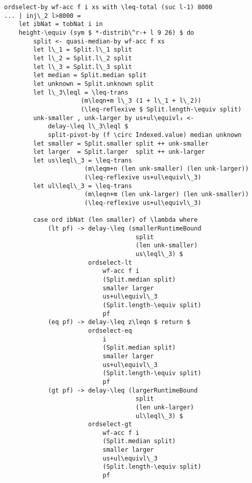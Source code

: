 \begin{lstlisting}[caption={Quickselect ($l > 8000$)},label={lst:median:quickselect:large},emph={ordselect,by}]
ordselect-by wf-acc f i xs with \leq-total (suc l-1) 8000
... | inj\_2 l>8000 =
    let ibNat = tobNat i in
    height-\equiv (sym $ *-distrib\^r-+ l 9 26) $ do
        split <- quasi-median-by wf-acc f xs
        let l\_1 = Split.l\_1 split
        let l\_2 = Split.l\_2 split
        let l\_3 = Split.l\_3 split
        let median = Split.median split
        let unknown = Split.unknown split
        let l\_3\leql = \leq-trans
                     (m\leqn+m l\_3 (1 + l\_1 + l\_2))
                     (\leq-reflexive $ Split.length-\equiv split)
        unk-smaller , unk-larger by us+ul\equivl₃ <-
            delay-\leq l\_3\leql $
            split-pivot-by (f \circ Indexed.value) median unknown
        let smaller = Split.smaller split ++ unk-smaller
        let larger  = Split.larger  split ++ unk-larger
        let us\leql\_3 = \leq-trans
                      (m\leqm+n (len unk-smaller) (len unk-larger))
                      (\leq-reflexive us+ul\equivl\_3)
        let ul\leql\_3 = \leq-trans
                      (m\leqn+m (len unk-larger) (len unk-smaller))
                      (\leq-reflexive us+ul\equivl\_3)

        case ord ibNat (len smaller) of \lambda where
            (lt pf) -> delay-\leq (smallerRuntimeBound
                                    split
                                    (len unk-smaller)
                                    us\leql\_3) $
                       ordselect-lt
                           wf-acc f i
                           (Split.median split)
                           smaller larger
                           us+ul\equivl\_3
                           (Split.length-\equiv split)
                           pf
            (eq pf) -> delay-\leq z\leqn $ return $
                       ordselect-eq
                           i
                           (Split.median split)
                           smaller larger
                           us+ul\equivl\_3
                           (Split.length-\equiv split)
                           pf
            (gt pf) -> delay-\leq (largerRuntimeBound
                                    split
                                    (len unk-larger)
                                    ul\leql\_3) $
                       ordselect-gt
                           wf-acc f i
                           (Split.median split)
                           smaller larger
                           us+ul\equivl\_3
                           (Split.length-\equiv split)
                           pf
\end{lstlisting}

